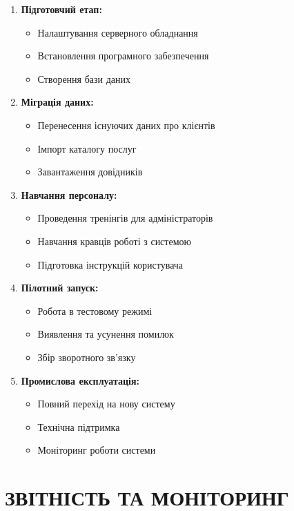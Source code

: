 \documentclass[14pt,a4paper]{extarticle}
\begin{document}
\begin{enumerate}
    \item \textbf{Підготовчий етап:}
    \begin{itemize}
        \item Налаштування серверного обладнання
        \item Встановлення програмного забезпечення
        \item Створення бази даних
    \end{itemize}
    
    \item \textbf{Міграція даних:}
    \begin{itemize}
        \item Перенесення існуючих даних про клієнтів
        \item Імпорт каталогу послуг
        \item Завантаження довідників
    \end{itemize}
    
    \item \textbf{Навчання персоналу:}
    \begin{itemize}
        \item Проведення тренінгів для адміністраторів
        \item Навчання кравців роботі з системою
        \item Підготовка інструкцій користувача
    \end{itemize}
    
    \item \textbf{Пілотний запуск:}
    \begin{itemize}
        \item Робота в тестовому режимі
        \item Виявлення та усунення помилок
        \item Збір зворотного зв'язку
    \end{itemize}
    
    \item \textbf{Промислова експлуатація:}
    \begin{itemize}
        \item Повний перехід на нову систему
        \item Технічна підтримка
        \item Моніторинг роботи системи
    \end{itemize}
\end{enumerate}

\newpage
\section{ЗВІТНІСТЬ ТА МОНІТОРИНГ}
\end{document}
